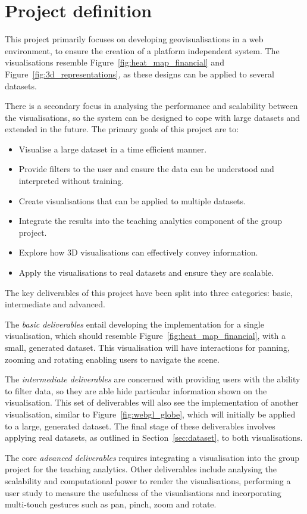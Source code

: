 \section{Project definition} {
\label{sec:project_definition}

	This project primarily focuses on developing geovisualisations in a web environment, to ensure the creation of a platform independent system. The visualisations resemble Figure~\ref{fig:heat_map_financial} and Figure~\ref{fig:3d_representations}, as these designs can be applied to several datasets.

	

	There is a secondary focus in analysing the performance and scalability between the visualisations, so the system can be designed to cope with large datasets and extended in the future. The primary goals of this project are to:

	\begin{itemize}
		\item Visualise a large dataset in a time efficient manner.
		\item Provide filters to the user and ensure the data can be understood and interpreted without training.
		\item Create visualisations that can be applied to multiple datasets.
		\item Integrate the results into the teaching analytics component of the group project.
		\item Explore how 3D visualisations can effectively convey information.
		\item Apply the visualisations to real datasets and ensure they are scalable.
	\end{itemize}

	The key deliverables of this project have been split into three categories: basic, intermediate and advanced.

	The \emph{basic deliverables} entail developing the implementation for a single visualisation, which should resemble Figure~\ref{fig:heat_map_financial}, with a small, generated dataset. This visualisation will have interactions for panning, zooming and rotating enabling users to navigate the scene.

	The \emph{intermediate deliverables} are concerned with providing users with the ability to filter data, so they are able hide particular information shown on the visualisation. This set of deliverables will also see the implementation of another visualisation, similar to Figure~\ref{fig:webgl_globe}, which will initially be applied to a large, generated dataset. The final stage of these deliverables involves applying real datasets, as outlined in Section~\ref{sec:dataset}, to both visualisations.

	The core \emph{advanced deliverables} requires integrating a visualisation into the group project for the teaching analytics. Other deliverables include analysing the scalability and computational power to render the visualisations, performing a user study to measure the usefulness of the visualisations and incorporating multi-touch gestures such as pan, pinch, zoom and rotate.
	
}

